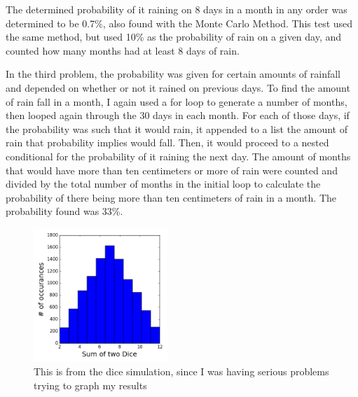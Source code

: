 \documentclass[twocolumn]{revtex4}
\begin{document}
The determined probability of it raining on 8 days in a month in any order was determined to be 0.7\%, also found with the Monte Carlo Method. This test used the same method, but used 10\% as the probability of rain on a given day, and counted how many months had at least 8 days of rain.

In the third problem, the probability was given for certain amounts of rainfall and depended on whether or not it rained on previous days. To find the amount of rain fall in a month, I again used a for loop to generate a number of months, then looped again through the 30 days in each month. For each of those days, if the probability was such that it would rain, it appended to a list the amount of rain that probability implies would fall. Then, it would proceed to a nested conditional for the probability of it raining the next day. The amount of months that would have more than ten centimeters or more of rain were counted and divided by the total number of months in the initial loop to calculate the probability of there being more than ten centimeters of rain in a month. The probability found was 33\%.

\begin{figure}
 \includegraphics[width=0.45\textwidth]{histo.png}
\caption{This is from the dice simulation, since I was having serious problems trying to graph my results}
\end{figure}

\end{document}
